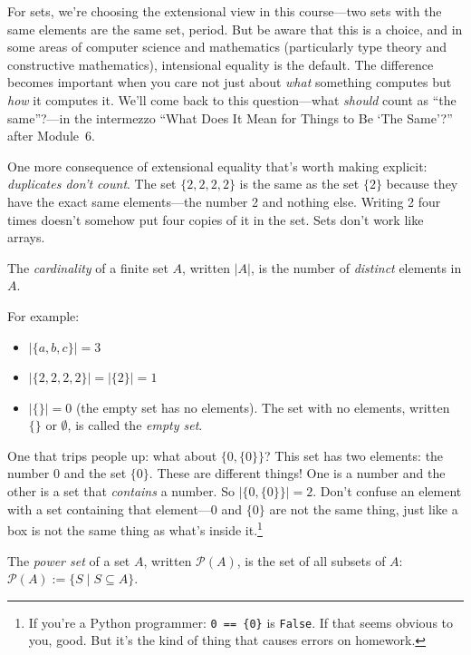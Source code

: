 \documentclass[11pt]{article}
\begin{document}
For sets, we're choosing the extensional view in this course---two sets with the same elements are the same set, period. But be aware that this is a choice, and in some areas of computer science and mathematics (particularly type theory and constructive mathematics), intensional equality is the default. The difference becomes important when you care not just about \emph{what} something computes but \emph{how} it computes it. We'll come back to this question---what \emph{should} count as ``the same''?---in the intermezzo ``What Does It Mean for Things to Be `The Same'?'' after Module~6.

One more consequence of extensional equality that's worth making explicit: \emph{duplicates don't count}. The set $\{2, 2, 2, 2\}$ is the same as the set $\{2\}$ because they have the exact same elements---the number 2 and nothing else. Writing 2 four times doesn't somehow put four copies of it in the set. Sets don't work like arrays.

\begin{definition}[Cardinality]
The \emph{cardinality} of a finite set $A$, written $|A|$, is the number of \emph{distinct} elements in $A$.
\end{definition}

For example:
\begin{itemize}
  \item $|\{a, b, c\}| = 3$
  \item $|\{2, 2, 2, 2\}| = |\{2\}| = 1$
  \item $|\{\}| = 0$ (the empty set has no elements). The set with no elements, written $\{\}$ or $\emptyset$, is called the \emph{empty set}.
\end{itemize}

One that trips people up: what about $\{0, \{0\}\}$? This set has two elements: the number $0$ and the set $\{0\}$. These are different things! One is a number and the other is a set that \emph{contains} a number. So $|\{0, \{0\}\}| = 2$. Don't confuse an element with a set containing that element---$0$ and $\{0\}$ are not the same thing, just like a box is not the same thing as what's inside it.\footnote{If you're a Python programmer: \texttt{0 == \{0\}} is \texttt{False}. If that seems obvious to you, good. But it's the kind of thing that causes errors on homework.}

\begin{definition}
The \emph{power set} of a set $A$, written $\mathcal{P}(A)$, is the set of all subsets of $A$:
$\mathcal{P}(A) := \{S \mid S \subseteq A\}$.
\end{definition}
\end{document}
